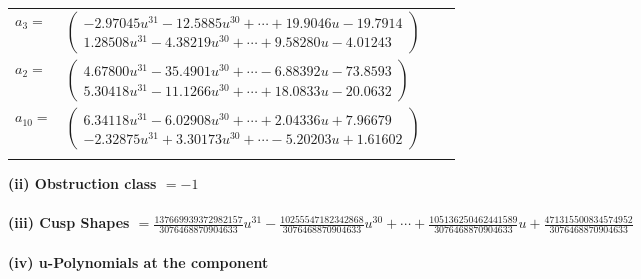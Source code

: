 \documentclass[1p]{elsarticle_modified}
\theoremstyle{definition}
\begin{document}
\begin{tabular}{m{7pt} m{180pt} m{7pt} m{180pt} }
\flushright $a_{3}=$&$\begin{pmatrix}-2.97045 u^{31}-12.5885 u^{30}+\cdots+19.9046 u-19.7914\\1.28508 u^{31}-4.38219 u^{30}+\cdots+9.58280 u-4.01243\end{pmatrix}$ \\
\flushright $a_{2}=$&$\begin{pmatrix}4.67800 u^{31}-35.4901 u^{30}+\cdots-6.88392 u-73.8593\\5.30418 u^{31}-11.1266 u^{30}+\cdots+18.0833 u-20.0632\end{pmatrix}$ \\
\flushright $a_{10}=$&$\begin{pmatrix}6.34118 u^{31}-6.02908 u^{30}+\cdots+2.04336 u+7.96679\\-2.32875 u^{31}+3.30173 u^{30}+\cdots-5.20203 u+1.61602\end{pmatrix}$\\&\end{tabular}
\flushleft \textbf{(ii) Obstruction class $= -1$}\\~\\
\flushleft \textbf{(iii) Cusp Shapes $= \frac{137669939372982157}{3076468870904633} u^{31}-\frac{10255547182342868}{3076468870904633} u^{30}+\cdots+\frac{105136250462441589}{3076468870904633} u+\frac{471315500834574952}{3076468870904633}$}\\~\\
\newpage\renewcommand{\arraystretch}{1}
\flushleft \textbf{(iv) u-Polynomials at the component}\newline \\
\end{document}
